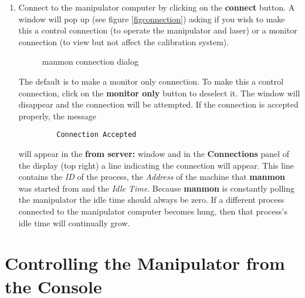 \begin{enumerate}
\item Connect to the manipulator computer by clicking on the {\bf connect}
  button.  A window will pop up (see figure \ref{figconnection}) 
  asking if you wish to make this a
  control connection (to operate the manipulator and laser) or a monitor
  connection (to view but not affect the calibration system).
  \begin{figure}[h]
  \begin{center}
  \leavevmode
  \epsfxsize=2in
  \end{center}
  \caption[manmon main window] 
        {manmon connection dialog
        }
  \end{figure}
  The default is to make a monitor only connection.  To make this a 
  control connection, click on the {\bf monitor only} button to deselect
  it.  The window will disappear and the connection will be attempted.
  If the connection is accepted properly, the message 
  \begin{verbatim}
         Connection Accepted
  \end{verbatim}
  will appear in the {\bf from server:} window and in the {\bf Connections}
  panel of the display (top right) a line indicating the connection will
  appear.  This line contains the {\em ID} of the process, the {\em Address}
  of the machine that {\bf manmon} was started from and the {\em Idle Time}.
  Because {\bf manmon} is constantly polling the manipulator the idle time
  should always be zero.  If a different process connected to the
  manipulator computer becomes hung, then that process's idle time
  will continually grow.
  
\end{enumerate}
 



  
\newpage
\section{Controlling the Manipulator from the Console}
  
